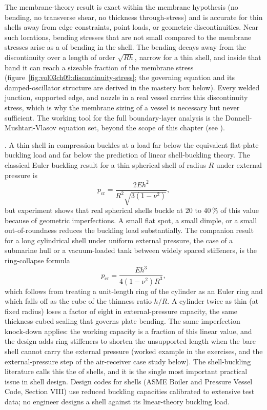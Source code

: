 The membrane-theory result is exact within the membrane hypothesis
(no bending, no transverse shear, no thickness through-stress) and
is accurate for thin shells away from edge constraints, point loads,
or geometric discontinuities. Near such locations, bending stresses
that are not small compared to the membrane stresses arise as a
 of bending in the shell. The bending decays
away from the discontinuity over a length of order $\sqrt{Rh}$, narrow
for a thin shell, and inside that band it can reach a sizeable fraction
of the membrane stress (figure~\ref{fig:vol03ch09:discontinuity-stress};
the governing equation and its damped-oscillator structure are derived
in the mastery box below). Every welded junction, supported edge, and
nozzle in a real vessel carries this discontinuity stress, which is why
the membrane sizing of a vessel is necessary but never sufficient. The
working tool for the full boundary-layer analysis is the
Donnell-Mushtari-Vlasov equation set, beyond the scope of this chapter
(see \cite[ch.~14]{text:timoshenko-plates-shells}).



. A thin shell in compression buckles at a
load far below the equivalent flat-plate buckling load and far below
the prediction of linear shell-buckling theory. The classical Euler
buckling result for a thin spherical shell of radius $R$ under
external pressure is
\[
p_{\text{cr}} = \frac{2 E h^2}{R^2 \sqrt{3(1-\nu^2)}},
\]
but experiment shows that real spherical shells buckle at $20$ to
$40\,\%$ of this value because of geometric imperfections. A small
flat spot, a small dimple, or a small out-of-roundness reduces the
buckling load substantially. The companion result for a long
cylindrical shell under uniform external pressure, the case of a
submarine hull or a vacuum-loaded tank between widely spaced
stiffeners, is the ring-collapse formula
\[
p_{\text{cr}} = \frac{E h^3}{4(1-\nu^2) R^3},
\]
which follows from treating a unit-length ring of the cylinder as an
Euler ring and which falls off as the cube of the thinness ratio
$h/R$. A cylinder twice as thin (at fixed radius) loses a factor of
eight in external-pressure capacity, the same thickness-cubed scaling
that governs plate bending. The same imperfection knock-down applies:
the working capacity is a fraction of this linear value, and the
design adds ring stiffeners to shorten the unsupported length when the
bare shell cannot carry the external pressure (worked example in the
exercises, and the external-pressure step of the air-receiver case
study below). The shell-buckling literature calls
this the  of shells, and it is the
single most important practical issue in shell design. Design
codes for shells (ASME Boiler and Pressure Vessel Code, Section VIII)
use reduced buckling capacities calibrated to extensive test data;
no engineer designs a shell against its linear-theory buckling load.

